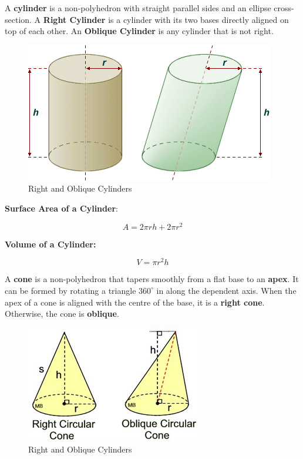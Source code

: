         \noindent A \textbf{cylinder} is a non-polyhedron with straight parallel sides and an
        ellipse cross-section. A \textbf{Right Cylinder} is a cylinder with its two bases
        directly aligned on top of each other. An \textbf{Oblique Cylinder} is any cylinder
        that is not right.

        \begin{figure} [hbt!]
            \centering
            \includegraphics[scale=0.5]{Resources/Unit6Solids/cylinders.png}
            \caption*{Right and Oblique Cylinders}
        \end{figure}

        \noindent \color{purple} \textbf{Surface Area of a Cylinder}: \color{black}

        \begin{equation*}
            A=2\pi rh+2\pi r^2
        \end{equation*}

        \noindent \color{purple} \textbf{Volume of a Cylinder:} \color{black}

        \begin{equation*}
            V=\pi r^2 h
        \end{equation*}

        \noindent A \textbf{cone} is a non-polyhedron that tapers smoothly from a flat base
        to an \textbf{apex}. It can be formed by rotating a triangle $360^\circ$ in along
        the dependent axis. When the apex of a cone is aligned with the centre of the base,
        it is a \textbf{right cone}. Otherwise, the cone is \textbf{oblique}. \\

        \begin{figure} [hbt!]
            \centering
            \includegraphics[scale=0.5]{Resources/Unit6Solids/cones.jpg}
            \caption*{Right and Oblique Cylinders}
        \end{figure}

